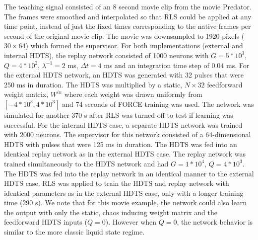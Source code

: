 \documentclass[11pt]{article} %
\begin{document}
The teaching signal consisted of an 8 second movie clip from the movie Predator.  The frames were smoothed and interpolated so that RLS could be applied at any time point, instead of just the fixed times corresponding to the native frames per second of the original movie clip.  The movie was downsampled to 1920 pixels ($30\times 64$) which formed the supervisor.  For both implementations (external and internal HDTS), the replay network consisted of 1000 neurons with $G=5*10^3$, $Q = 4*10^2$, $\lambda^{-1} =  2$ ms, $\Delta t = 4$ ms and an integration time step of $0.04$ ms.  For the external HDTS network, an HDTS was generated with 32 pulses that were 250 ms in duration.  The HDTS was multiplied by a static, $N\times 32$ feedforward weight matrix, $W^{in}$ where each weight was drawn uniformly from $[-4*10^3,4*10^3]$ and 74 seconds of FORCE training was used.  The network was simulated for another 370 s after RLS was turned off to test if learning was successful.  For the internal HDTS case, a separate HDTS network was trained with 2000 neurons.  The supervisor for this network consisted of a 64-dimensional HDTS with pulses that were 125 ms in duration.  The HDTS was fed into an identical replay network as in the external HDTS case.  The replay network was trained simultaneously to the HDTS network and had $G = 1*10^4$, $Q = 4*10^3$.  The HDTS was fed into the replay network in an identical manner to the external HDTS case.  RLS was applied to train the HDTS and replay network with identical parameters as in the external HDTS case, only with a longer training time (290 s).   We note that for this movie example, the network could also learn the output with only the static, chaos inducing weight matrix and the feedforward HDTS inputs ($Q=0$).  However when $Q=0$, the network behavior is similar to the more classic liquid state regime.  

\newpage

\begin{figure}[htp!]
\centering 
\end{figure}
\end{document}
